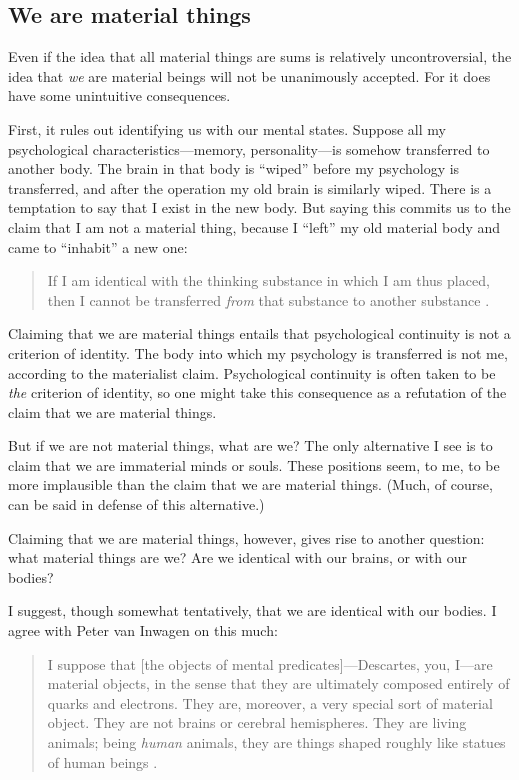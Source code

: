 \documentclass[12pt,twoside]{reedfancy}
\begin{document}
\begin{spacing}{1.25}
\subsection{We are material things}
\label{material-beings}
Even if the idea that all material things are sums is relatively
uncontroversial, the idea that {\em we} are material beings will not
be unanimously accepted.  For it does have some unintuitive
consequences.

First, it rules out identifying us with our mental states.  Suppose
all my psychological characteristics---memory, personality---is
somehow transferred to another body.  The brain in that body is
``wiped'' before my psychology is transferred, and after the operation
my old brain is similarly wiped.  There is a temptation to say that I
exist in the new body.  But saying this commits us to the claim that I
am not a material thing, because I ``left'' my old material body and
came to ``inhabit'' a new one:

\begin{quote}
 If I am identical with the thinking substance in which I am thus
 placed, then I cannot be transferred {\em from} that substance to
 another substance \citep[107]{chisholm1979}.
\end{quote}

Claiming that we are material things entails that psychological
continuity is not a criterion of identity.  The body into which my
psychology is transferred is not me, according to the materialist
claim.  Psychological continuity is often taken to be {\em the}
criterion of identity, so one might take this consequence as a
refutation of the claim that we are material things.

But if we are not material things, what are we?  The only alternative
I see is to claim that we are immaterial minds or souls.  These
positions seem, to me, to be more implausible than the claim that we
are material things.  (Much, of course, can be said in defense of this
alternative.)

Claiming that we are material things, however, gives rise to another
question: what material things are we?  Are we identical with our
brains, or with our bodies?

I suggest, though somewhat tentatively, that we are identical with our
bodies.  I agree with Peter van Inwagen on this much:

\begin{quote}
I suppose that [the objects of mental predicates]---Descartes, you,
I---are material objects, in the sense that they are ultimately
composed entirely of quarks and electrons.  They are, moreover, a very
special sort of material object.  They are not brains or cerebral
hemispheres.  They are living animals; being {\em human} animals, they
are things shaped roughly like statues of human beings
\citeyearpar[6]{inwagen1995}.
\end{quote}


\end{spacing}
\end{document}
